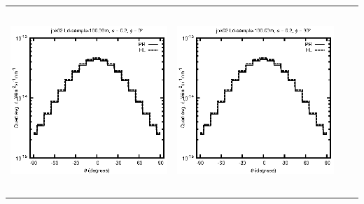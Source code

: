 \documentclass[10pt,a4paper]{article}
\begin{document}
\begin{adjustwidth}{-1.2in}{-1.2in}
\begin{tabular}{c c c c}
\includegraphics[height=7cm]{../eps/jok02_Ld_sample_100.00m_fwd.eps} &
\includegraphics[height=7cm]{../eps/jok02_Ld_sample_100.00m_cross.eps} \\
\end{tabular}

\pagebreak


\end{adjustwidth}
\end{document}
